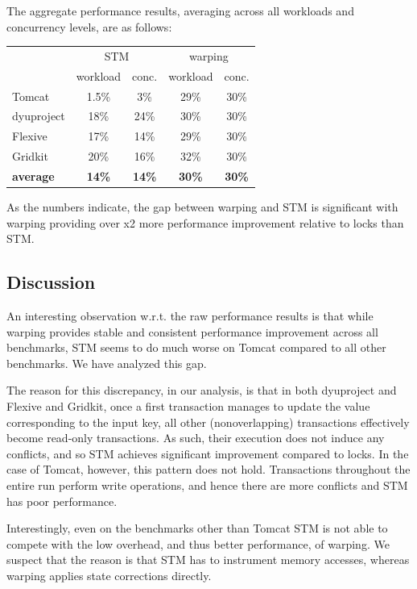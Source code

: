 The aggregate performance results, averaging across all workloads and concurrency levels, are as follows:
\begin{center}
\begin{tabular}{l|c|c|c|c}
					& \multicolumn{2}{c|}{STM} & \multicolumn{2}{c}{warping} \\
					\cline{2-5} 
					& workload & conc. & workload & conc. \\
\hline
Tomcat	  	 &	1.5\%		&	3\% & 29\%		& 30\% \\			   
dyuproject	 & 	18\%		& 	24\%	    & 30\% &	30\%	\\
Flexive 		&	17\%	  &		14\%			& 29\% & 30\%	\\ 
Gridkit 		&	20\% 	&		16\%		& 32\% & 30\%	\\
\hline\hline	
{\bf average} & {\bf 14\%} 	&   {\bf 14\%}    & {\bf 30\%}   & {\bf 30\%} \\
\end{tabular}
\end{center}
As the numbers indicate, the gap between warping and STM is significant with warping providing over x2 more performance improvement relative to locks than STM.

\subsection{Discussion}

An interesting observation w.r.t. the raw performance results is that while warping provides stable and consistent performance improvement across all benchmarks, STM seems to do much worse on Tomcat compared to all other benchmarks. We have analyzed this gap.

The reason for this discrepancy, in our analysis, is that in both dyuproject and Flexive and Gridkit, once a first transaction manages to update the value corresponding to the input key, all other (nonoverlapping) transactions effectively become read-only transactions. As such, their execution does not induce any conflicts, and so STM achieves significant improvement compared to locks. In the case of Tomcat, however, this pattern does not hold. Transactions throughout the entire run perform write operations, and hence there are more conflicts and STM has poor performance.

Interestingly, even on the benchmarks other than Tomcat STM is not able to compete with the low overhead, and thus better performance, of warping. We suspect that the reason is that STM has to instrument memory accesses, whereas warping applies state corrections directly.

